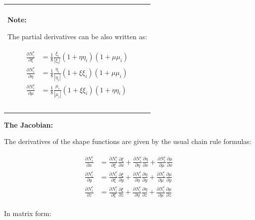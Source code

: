 \documentclass[10pt,b5paper,titlepage]{book}
\newenvironment{bbox}[1][0.96]
{
    \begin{center}
        \begin{tabular}{|p{#1\textwidth}|}
            \hline\\
}
{
            \\\\\hline
        \end{tabular}
    \end{center}
}
\newenvironment{eqarray}
{
    \begin{eqnarray}
        \begin{aligned}
}
{
        \end{aligned}
    \end{eqnarray}
}
\begin{document}
\begin{bbox}
    \textbf{Note:}

    The partial derivatives can be also written as:

    \begin{eqarray}
        \frac{\partial N_i^e}{\partial \xi} &= \frac{1}{8} \frac{\xi_i}{|\xi_i|}
            \left(1+\eta\eta_i\right) \left(1+\mu\mu_i\right) \\
        \frac{\partial N_i^e}{\partial \eta} &= \frac{1}{8} \frac{\eta_i}{|\eta_i|}
            \left(1+\xi\xi_i\right) \left(1+\mu\mu_i\right) \\
        \frac{\partial N_i^e}{\partial \mu} &= \frac{1}{8} \frac{\mu_i}{|\mu_i|}
            \left(1+\xi\xi_i\right) \left(1+\eta\eta_i\right)
    \end{eqarray}
\end{bbox}



\textbf{The Jacobian:}

The derivatives of the shape functions are given by the usual chain rule formulas:

\begin{eqarray}
    \frac{\partial N_i^e}{\partial x} &=
        \frac{\partial N_i^e}{\partial \xi} \frac{\partial \xi}{\partial x} +
        \frac{\partial N_i^e}{\partial \eta} \frac{\partial \eta}{\partial x} +
        \frac{\partial N_i^e}{\partial \mu} \frac{\partial \mu}{\partial x}\\
    \frac{\partial N_i^e}{\partial y} &=
        \frac{\partial N_i^e}{\partial \xi} \frac{\partial \xi}{\partial y} +
        \frac{\partial N_i^e}{\partial \eta} \frac{\partial \eta}{\partial y} +
        \frac{\partial N_i^e}{\partial \mu} \frac{\partial \mu}{\partial y}\\
    \frac{\partial N_i^e}{\partial z} &=
        \frac{\partial N_i^e}{\partial \xi} \frac{\partial \xi}{\partial z} +
        \frac{\partial N_i^e}{\partial \eta} \frac{\partial \eta}{\partial z} +
        \frac{\partial N_i^e}{\partial \mu} \frac{\partial \mu}{\partial z}
\end{eqarray}

In matrix form:
\end{document}
